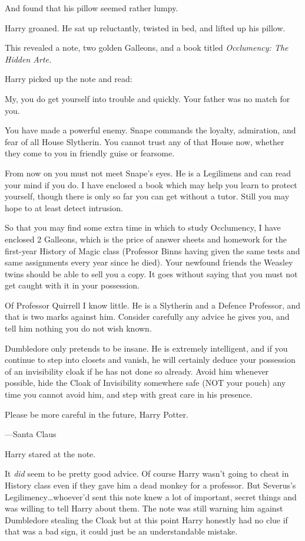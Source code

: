 And found that his pillow seemed rather lumpy.

Harry groaned. He sat up reluctantly, twisted in bed, and lifted up his pillow.

This revealed a note, two golden Galleons, and a book titled \emph{Occlumency:
The Hidden Arte.}

Harry picked up the note and read:

\begin{writtenNote}
My, you do get yourself into trouble and quickly. Your father was no
match for you.

You have made a powerful enemy. Snape commands the loyalty, admiration,
and fear of all House Slytherin. You cannot trust any of that House now,
whether they come to you in friendly guise or fearsome.

From now on you must not meet Snape’s eyes. He is a Legilimens and can
read your mind if you do. I have enclosed a book which may help you learn to
protect yourself, though there is only so far you can get without a tutor.
Still you may hope to at least detect intrusion.

So that you may find some extra time in which to study Occlumency, I have
enclosed 2 Galleons, which is the price of answer sheets and homework for the
first-year History of Magic class (Professor Binns having given the same tests
and same assignments every year since he died). Your newfound friends the
Weasley twins should be able to sell you a copy. It goes without saying that
you must not get caught with it in your possession.

Of Professor Quirrell I know little. He is a Slytherin and a Defence
Professor, and that is two marks against him. Consider carefully any advice he
gives you, and tell him nothing you do not wish known.

Dumbledore only pretends to be insane. He is extremely intelligent, and
if you continue to step into closets and vanish, he will certainly deduce your
possession of an invisibility cloak if he has not done so already. Avoid him
whenever possible, hide the Cloak of Invisibility somewhere safe (NOT your
pouch) any time you cannot avoid him, and step with great care in his presence.

Please be more careful in the future, Harry Potter.

—Santa Claus
\end{writtenNote}

Harry stared at the note.

It \emph{did} seem to be pretty good advice. Of course Harry wasn’t going to
cheat in History class even if they gave him a dead monkey for a professor. But
Severus’s Legilimency…whoever’d sent this note knew a lot of important,
secret things and was willing to tell Harry about them. The note was still
warning him against Dumbledore stealing the Cloak but at this point Harry
honestly had no clue if that was a bad sign, it could just be an understandable
mistake.

